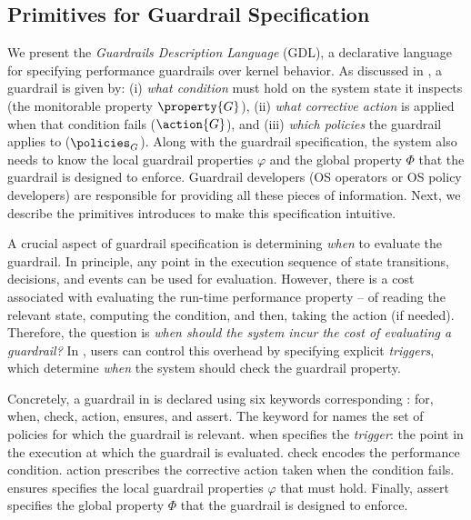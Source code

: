 \subsection{Primitives for Guardrail Specification}\label{sec:gdl}

We present the \emph{Guardrails Description Language} (GDL), a declarative language for specifying performance guardrails over kernel behavior.
As discussed in , a guardrail is given by: (i) \emph{what condition} must hold on the system state it inspects (the monitorable property $\property{G}$), (ii) \emph{what corrective action} is applied when that condition fails ($\action{G}$), and (iii) \emph{which policies} the guardrail applies to ($\policies_G$).
Along with the guardrail specification, the system also needs to know the local guardrail properties $\varphi$ and the global \perfsafety property $\Phi$ that the guardrail is designed to enforce.
Guardrail developers (OS operators or OS policy developers) are responsible for providing all these pieces of information.
Next, we describe the primitives \lang introduces to make this specification intuitive.

A crucial aspect of guardrail specification is determining \emph{when} to evaluate the guardrail.
In principle, any point in the execution sequence of state transitions, decisions, and events can be used for evaluation.
However, there is a cost associated with evaluating the run-time performance property -- of reading the relevant state, computing the condition, and then, taking the action (if needed).
Therefore, the question is {\it when should the system incur the cost of evaluating a guardrail?}
In \lang, users can control this overhead by specifying explicit {\em triggers}, which determine \emph{when} the system should check the guardrail property.

Concretely, a guardrail in \lang is declared using six keywords corresponding : {\sf for}, {\sf when}, {\sf check}, {\sf action}, {\sf ensures}, and {\sf assert}.
The keyword {\sf for} names the set of policies for which the guardrail is relevant.
{\sf when} specifies the \emph{trigger}: the point in the execution at which the guardrail is evaluated.
{\sf check} encodes the performance condition.
{\sf action} prescribes the corrective action taken when the condition fails.
{\sf ensures} specifies the local guardrail properties $\varphi$ that must hold.
Finally, {\sf assert} specifies the global \perfsafety property $\Phi$ that the guardrail is designed to enforce.

